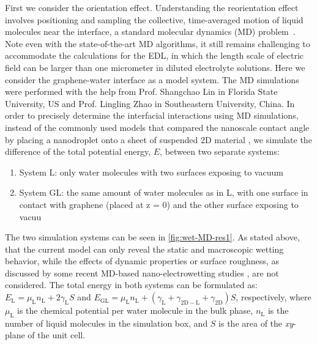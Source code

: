 First we consider the orientation effect. Understanding the
reorientation effect involves positioning and sampling the collective,
time-averaged motion of liquid molecules near the interface, a
standard molecular dynamics (MD)
problem~\cite{Israelachvili_2011_book}.
%
Note even with the
state-of-the-art MD algorithms, it still remains challenging to accommodate
the calculations for the EDL, in which the length scale of electric
field can be larger than one micrometer in diluted electrolyte
solutions.
Here we consider the graphene-water interface as a model system. The
MD simulations were performed with the help from Prof. Shangchao Lin
in Florida State University, US and Prof. Lingling Zhao in
Southeastern University, China.
%
In order to precisely determine the interfacial interactions using MD
simulations, instead of the commonly used models that compared the
nanoscale contact angle by placing a nano\-droplet onto a sheet of
suspended 2D material
\cite{Ostrowski_2014_tunable,Daub_2007_nanoscale_EW,Ren_2015_interfacial,Taherian_2015_asym_EW},
we simulate the difference of the total potential energy,
\(E\), between two separate systems:
\begin{enumerate}
\item System L: only water molecules with two surfaces exposing to vacuum
  
\item System GL: the same amount of water molecules as in L, with one
  surface in contact with graphene (placed at z = 0) and the other
  surface exposing to vacuu
\end{enumerate}
%
The two simulation systems can be seen in \autoref{fig:wet-MD-res1}.
%
As stated above, that the current model can only reveal the static and
macroscopic wetting behavior, while the effects of dynamic properties
or surface roughness, as discussed by some recent MD-based
nano-electrowetting studies \cite{Yuan_2010_PF,Zhao_2015_pillar}, are
not considered.
%
The total energy in both systems
can be formulated as:
\(E_{\mathrm{L}} = \mu_{\mathrm{L}}n_{\mathrm{L}} +
2\gamma_{\mathrm{L}}S\) and
\(E_{\mathrm{GL}}=\mu_{\mathrm{L}}n_{\mathrm{L}}+(\gamma_{\mathrm{L}}
+ \gamma_{\mathrm{2D-L}} + \gamma_{\mathrm{2D}})S\), respectively,
where \(\mu_{\mathrm{L}}\) is the chemical potential per water
molecule in the bulk phase, \(n_{\mathrm{L}}\) is the number of liquid
molecules in the simulation box, and \(S\) is the area of the 
\emph{xy}-plane of the unit cell.
